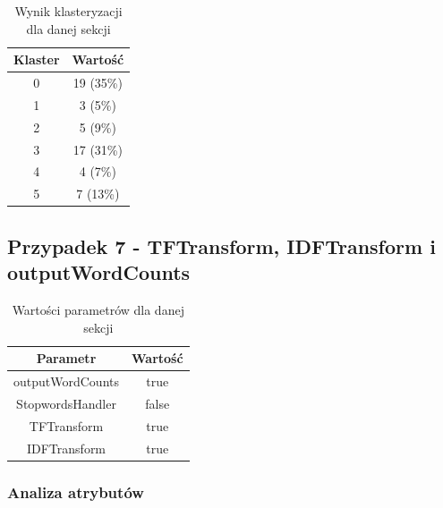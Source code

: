\documentclass[../EDI_Task2_Karwowski_Kowalewski.tex]{subfiles}
\begin{document}
{{{            \begin{table}[!htbp]
                \small
                \centering
                \begin{tabular}{|c|c|}
                    \hline
                    Klaster & Wartość \\ \hline
                    0   &  19 (35\%) \\
                    1   &   3 (5\%) \\
                    2   &   5 (9\%) \\
                    3   &  17 (31\%) \\
                    4   &   4 (7\%) \\
                    5   &   7 (13\%) \\ \hline
                \end{tabular}
                \caption{Wynik klasteryzacji dla danej sekcji}
            \end{table}
            \FloatBarrier
        }
    }

    \subsection{Przypadek 7 - TFTransform, IDFTransform i outputWordCounts} {

        \begin{table}[!htbp]
            \small
            \centering
            \begin{tabular}{|c|c|}
                \hline
                Parametr & Wartość \\ \hline
                outputWordCounts & true \\ \hline
                StopwordsHandler & false \\ \hline
                TFTransform & true \\ \hline
                IDFTransform & true \\ \hline
            \end{tabular}
            \caption{Wartości parametrów dla danej sekcji}
        \end{table}
        \FloatBarrier

        \subsubsection{Analiza atrybutów} {

}}}
\end{document}
